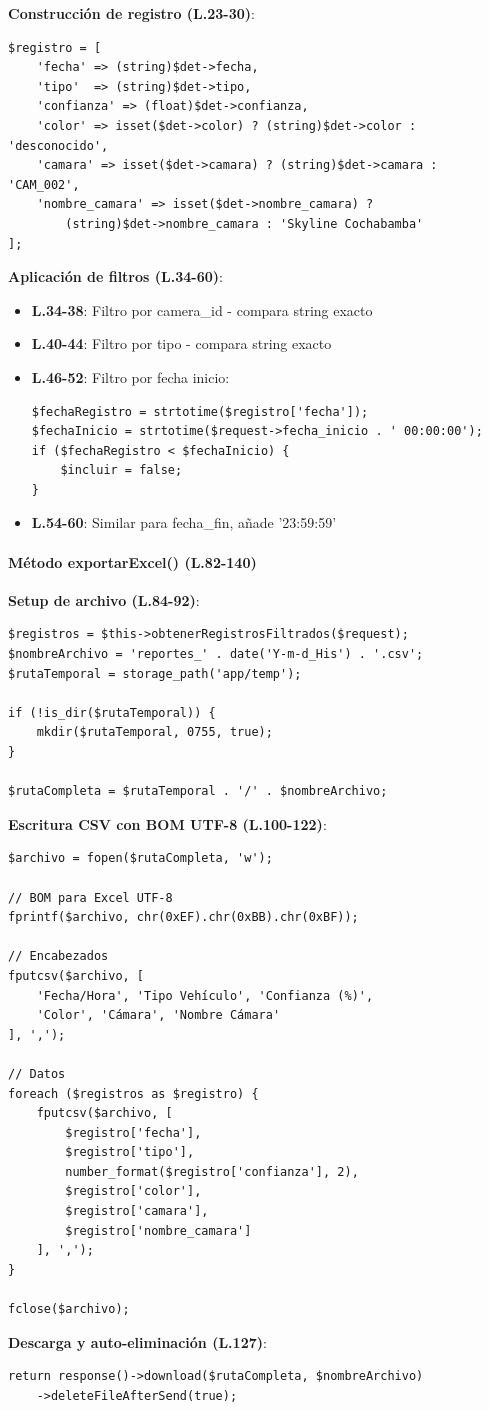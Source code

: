 \textbf{Construcción de registro (L.23-30)}:
\begin{lstlisting}[style=phpstyle]
$registro = [
    'fecha' => (string)$det->fecha,
    'tipo'  => (string)$det->tipo,
    'confianza' => (float)$det->confianza,
    'color' => isset($det->color) ? (string)$det->color : 'desconocido',
    'camara' => isset($det->camara) ? (string)$det->camara : 'CAM_002',
    'nombre_camara' => isset($det->nombre_camara) ? 
        (string)$det->nombre_camara : 'Skyline Cochabamba'
];
\end{lstlisting}

\textbf{Aplicación de filtros (L.34-60)}:
\begin{itemize}
    \item \textbf{L.34-38}: Filtro por camera\_id - compara string exacto
    \item \textbf{L.40-44}: Filtro por tipo - compara string exacto
    \item \textbf{L.46-52}: Filtro por fecha inicio:
    \begin{lstlisting}[style=phpstyle]
$fechaRegistro = strtotime($registro['fecha']);
$fechaInicio = strtotime($request->fecha_inicio . ' 00:00:00');
if ($fechaRegistro < $fechaInicio) {
    $incluir = false;
}
    \end{lstlisting}
    \item \textbf{L.54-60}: Similar para fecha\_fin, añade '23:59:59'
\end{itemize}

\paragraph{Método exportarExcel() (L.82-140)}

\textbf{Setup de archivo (L.84-92)}:
\begin{lstlisting}[style=phpstyle]
$registros = $this->obtenerRegistrosFiltrados($request);
$nombreArchivo = 'reportes_' . date('Y-m-d_His') . '.csv';
$rutaTemporal = storage_path('app/temp');

if (!is_dir($rutaTemporal)) {
    mkdir($rutaTemporal, 0755, true);
}

$rutaCompleta = $rutaTemporal . '/' . $nombreArchivo;
\end{lstlisting}

\textbf{Escritura CSV con BOM UTF-8 (L.100-122)}:
\begin{lstlisting}[style=phpstyle]
$archivo = fopen($rutaCompleta, 'w');

// BOM para Excel UTF-8
fprintf($archivo, chr(0xEF).chr(0xBB).chr(0xBF));

// Encabezados
fputcsv($archivo, [
    'Fecha/Hora', 'Tipo Vehículo', 'Confianza (%)', 
    'Color', 'Cámara', 'Nombre Cámara'
], ',');

// Datos
foreach ($registros as $registro) {
    fputcsv($archivo, [
        $registro['fecha'],
        $registro['tipo'],
        number_format($registro['confianza'], 2),
        $registro['color'],
        $registro['camara'],
        $registro['nombre_camara']
    ], ',');
}

fclose($archivo);
\end{lstlisting}

\textbf{Descarga y auto-eliminación (L.127)}:
\begin{lstlisting}[style=phpstyle]
return response()->download($rutaCompleta, $nombreArchivo)
    ->deleteFileAfterSend(true);
\end{lstlisting}

\newpage
